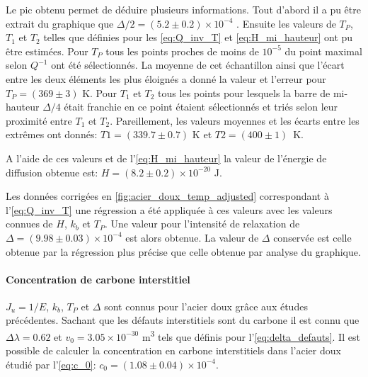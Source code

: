 Le pic obtenu permet de déduire plusieurs informations. Tout d'abord il a pu être extrait du graphique que $\Delta / 2 = (5.2 \pm 0.2) \times 10^{-4}$ . Ensuite les valeurs de $T_P$, $T_1$ et $T_2$ telles que définies pour les \autoref{eq:Q_inv_T} et \autoref{eq:H_mi_hauteur} ont pu être estimées. Pour $T_P$ tous les points proches de moins de $10^{-5}$ du point maximal selon $Q^{-1}$ ont été sélectionnés. La moyenne de cet échantillon ainsi que l'écart entre les deux éléments les plus éloignés a donné la valeur et l'erreur pour $T_P = (369 \pm 3)$ \si{\kelvin}. Pour $T_1$ et $T_2$ tous les points pour lesquels la barre de mi-hauteur $\Delta / 4$ était franchie en ce point étaient sélectionnés et triés selon leur proximité entre $T_1$ et $T_2$. Pareillement, les valeurs moyennes et les écarts entre les extrêmes ont donnés: $T1 = (339.7 \pm 0.7)$ \si{\kelvin} et \mbox{$T2 = (400 \pm 1)$ \si{\kelvin}}.

A l'aide de ces valeurs et de l'\autoref{eq:H_mi_hauteur} la valeur de l'énergie de diffusion obtenue est: $H = (8.2 \pm 0.2)\times 10^{-20}$ \si{\joule}.

Les données corrigées en \autoref{fig:acier_doux_temp_adjusted} correspondant à l'\autoref{eq:Q_inv_T} une régression a été appliquée à ces valeurs avec les valeurs connues de \(H\), $k_b$ et $T_P$. Une valeur pour l'intensité de relaxation de \(\Delta = (9.98 \pm 0.03) \times 10^{-4}\) est alors obtenue. La valeur de $\Delta$ conservée est celle obtenue par la régression plus précise que celle obtenue par analyse du graphique. 


\paragraph{Concentration de carbone interstitiel}

$J_u = 1/E$, $k_b$, $T_P$ et $\Delta$ sont connus pour l'acier doux grâce aux études précédentes. Sachant que les défauts interstitiels sont du carbone il est connu que $\Delta\lambda = 0.62$ et $v_0 = 3.05 \times 10^{-30}$ \si{\cubic\meter} tels que définis pour l'\autoref{eq:delta_defauts}. Il est possible de calculer la concentration en carbone interstitiels dans l'acier doux étudié par l'\autoref{eq:c_0}: $c_0 = (1.08 \pm 0.04)\times 10^{-4}$.
